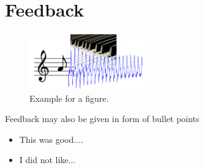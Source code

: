 \documentclass[a4paper, 9pt, twocolumn]{extarticle}
\begin{document}
\section{Feedback}
\label{section:feedback}


 \begin{figure}[h]
 \begin{center}
 \includegraphics[width=5cm]{images/figure_example.png}
 \end{center}
 \caption{
 Example for a figure.
 }
 \label{figure:example}
 \end{figure}


Feedback may also be given in form of bullet points
\begin{itemize}
\item This was good....
\item I did not like...
\end{itemize}




\small

\end{document}
